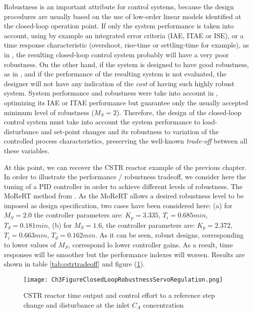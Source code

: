 Robustness is an important attribute for control systems, because the design procedures are usually based on the use of low-order linear models identified at the closed-loop operation point. If only the system performance is taken into account, using by example an integrated error criteria (IAE, ITAE or ISE), or a time response characteristic (overshoot, rise-time or settling-time for example), as in \cite{Huang2002, Tavakoli2003}, the resulting closed-loop control system probably will have a very poor robustness.  On the other hand, if the system is designed to have good robustness, as in \cite{Hagglund2008}, and if the performance of the resulting system is not evaluated, the designer will not have any indication of the \emph{cost} of having such highly robust system.  System performance and robustness were take into account in \cite{Shen2002, Tavakoli2005}, optimizing its IAE or ITAE performance but guarantee only the usually accepted minimum level of robustness ($M_S=2$). Therefore, the design of the closed-loop control system must take into account the system performance to load-disturbance and set-point changes and its robustness to variation of the controlled process characteristics, preserving the well-known \emph{trade-off} between all these variables.

At this point, we can recover the CSTR reactor example of the previous chapter. In order to illustrate the performance / robustness tradeoff, we consider here the tuning of a PID controller in order to achieve different levels of robustness. The MoReRT method from \cite{Alfaro2016}. As the MoReRT allows a desired robustness level to be imposed as design specification, two cases have been considered here: (a) for $M_S=2.0$ the controller parameters are: $K_p=3.335$, $T_i =0.685 min$, $T_d=0.181 min$, (b) for $M_S=1.6$, the controller parameters are: $K_p=2.372$, $T_i=0.663 min$, $T_d=0.162 min$. As it can be seen, robust designs, corresponding to lower values of $M_S$, correspond lo lower controller gains. As a result, time responses will be smoother but the performance indexes will worsen. Results are shown in table \ref{tab:cstrtradeoff} and figure (\ref{ch3:fig:Ch3FigureClosedLoopRobustnessServoRegulation}). 

\begin{figure}[htb]
    \begin{center}
        \texttt{[image: Ch3FigureClosedLoopRobustnessServoRegulation.png]}
        \caption{CSTR reactor time output and control effort to a reference step change and disturbance at the inlet $C_A$ concentration }
        \label{ch3:fig:Ch3FigureClosedLoopRobustnessServoRegulation}
    \end{center}
\end{figure}


